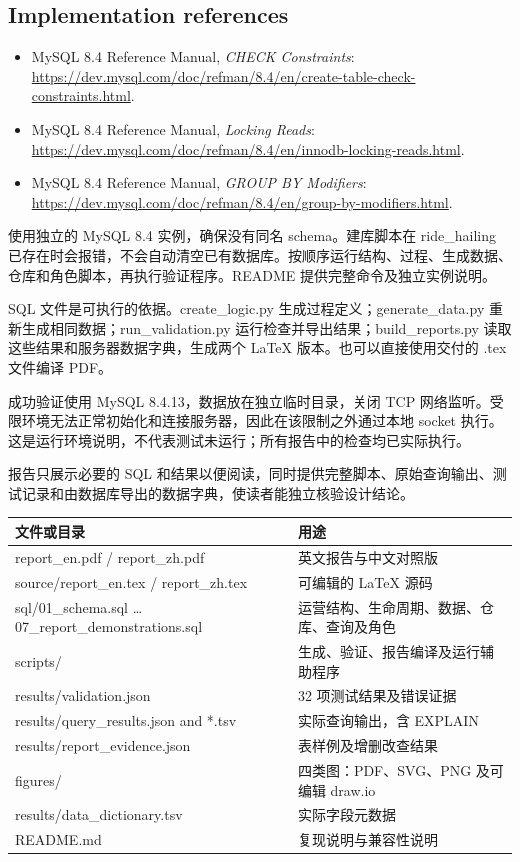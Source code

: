 \documentclass[11pt,a4paper]{article}
\begin{document}
\subsection*{Implementation references}
\begin{itemize}\small
\item MySQL 8.4 Reference Manual, \emph{CHECK Constraints}: \url{https://dev.mysql.com/doc/refman/8.4/en/create-table-check-constraints.html}.
\item MySQL 8.4 Reference Manual, \emph{Locking Reads}: \url{https://dev.mysql.com/doc/refman/8.4/en/innodb-locking-reads.html}.
\item MySQL 8.4 Reference Manual, \emph{GROUP BY Modifiers}: \url{https://dev.mysql.com/doc/refman/8.4/en/group-by-modifiers.html}.
\end{itemize}
使用独立的 MySQL 8.4 实例，确保没有同名 schema。建库脚本在 ride\_\allowbreak{}hailing 已存在时会报错，不会自动清空已有数据库。按顺序运行结构、过程、生成数据、仓库和角色脚本，再执行验证程序。README 提供完整命令及独立实例说明。

SQL 文件是可执行的依据。create\_\allowbreak{}logic.py 生成过程定义；generate\_\allowbreak{}data.py 重新生成相同数据；run\_\allowbreak{}validation.py 运行检查并导出结果；build\_\allowbreak{}reports.py 读取这些结果和服务器数据字典，生成两个 LaTeX 版本。也可以直接使用交付的 .tex 文件编译 PDF。

成功验证使用 MySQL 8.4.13，数据放在独立临时目录，关闭 TCP 网络监听。受限环境无法正常初始化和连接服务器，因此在该限制之外通过本地 socket 执行。这是运行环境说明，不代表测试未运行；所有报告中的检查均已实际执行。

报告只展示必要的 SQL 和结果以便阅读，同时提供完整脚本、原始查询输出、测试记录和由数据库导出的数据字典，使读者能独立核验设计结论。

\par\begingroup\small\noindent
\begin{tabularx}{\linewidth}{YY}
\toprule
文件或目录 & 用途\\\midrule
report\_\allowbreak{}en.pdf / report\_\allowbreak{}zh.pdf & 英文报告与中文对照版\\
source/report\_\allowbreak{}en.tex / report\_\allowbreak{}zh.tex & 可编辑的 LaTeX 源码\\
sql/01\_\allowbreak{}schema.sql … 07\_\allowbreak{}report\_\allowbreak{}demonstrations.sql & 运营结构、生命周期、数据、仓库、查询及角色\\
scripts/ & 生成、验证、报告编译及运行辅助程序\\
results/validation.json & 32 项测试结果及错误证据\\
results/query\_\allowbreak{}results.json and *.tsv & 实际查询输出，含 EXPLAIN\\
results/report\_\allowbreak{}evidence.json & 表样例及增删改查结果\\
figures/ & 四类图：PDF、SVG、PNG 及可编辑 draw.io\\
results/data\_\allowbreak{}dictionary.tsv & 实际字段元数据\\
README.md & 复现说明与兼容性说明\\
\bottomrule
\end{tabularx}
\par\endgroup
\end{document}
